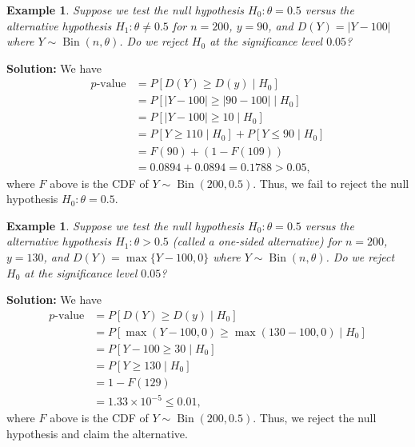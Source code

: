 \documentclass[10pt]{article}
\DeclareMathOperator{\Bin}{Bin}
\theoremstyle{newstyle}
\newtheorem{exmp}[thm]{Example}
\begin{document}
\begin{exmp}
Suppose we test the null hypothesis $H_0 : \theta = 0.5$ versus the alternative hypothesis 
$H_1 : \theta \neq 0.5$ for $n = 200$, $y = 90$, and $D(Y) = |Y - 100|$ 
where $Y \sim \Bin(n, \theta)$. Do we reject 
$H_0$ at the significance level $0.05$?
\end{exmp}
{\color{blue}
{\bf Solution:} We have 
\begin{align*}
    \text{$p$-value} 
    &= P[D(Y) \geq D(y) \mid H_0] \\
    &= P[|Y - 100| \geq |90 - 100| \mid H_0] \\
    &= P[|Y - 100| \geq 10 \mid H_0] \\
    &= P[Y \geq 110 \mid H_0] + P[Y \leq 90 \mid H_0] \\
    &= F(90) + (1 - F(109)) \\
    &= 0.0894 + 0.0894
    = 0.1788 
    > 0.05,
\end{align*}
where $F$ above is the CDF of $Y \sim \Bin(200, 0.5)$. Thus, we fail to reject the null hypothesis
$H_0 : \theta = 0.5$.}

\begin{exmp}
Suppose we test the null hypothesis $H_0 : \theta = 0.5$ versus the alternative hypothesis 
$H_1 : \theta > 0.5$ (called a one-sided alternative)
for $n = 200$, $y = 130$, and $D(Y) = \max\{Y - 100, 0\}$ 
where $Y \sim \Bin(n, \theta)$. Do we reject 
$H_0$ at the significance level $0.05$?
\end{exmp}
{\color{blue}
{\bf Solution:} We have 
\begin{align*}
    \text{$p$-value} 
    &= P[D(Y) \geq D(y) \mid H_0] \\
    &= P[\max(Y-100, 0) \geq \max(130-100, 0) \mid H_0] \\
    &= P[Y-100 \geq 30 \mid H_0] \\
    &= P[Y \geq 130 \mid H_0] \\
    &= 1 - F(129) \\
    &= 1.33 \times 10^{-5} 
    \leq 0.01,
\end{align*}
where $F$ above is the CDF of $Y \sim \Bin(200, 0.5)$. Thus, we reject the null hypothesis
and claim the alternative.}
\end{document}

